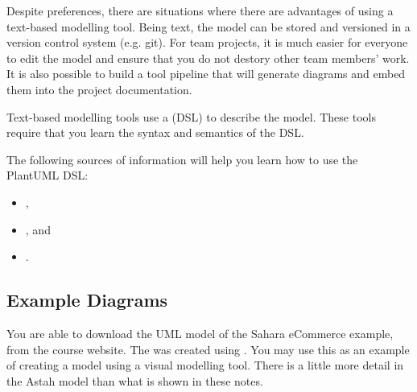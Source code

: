 Despite preferences, there are situations where there are advantages of using a text-based modelling tool.
Being text, the model can be stored and versioned in a version control system (e.g. git).
For team projects, it is much easier for everyone to edit the model and ensure that you do not destory other team members' work.
It is also possible to build a tool pipeline that will generate diagrams and embed them into the project documentation.

Text-based modelling tools use a
 (DSL) to describe the model.
These tools require that you learn the syntax and semantics of the DSL.

The following sources of information will help you learn how to use the PlantUML DSL:
\begin{itemize}[nosep]
    \item {},
    \item {}, and
    \item {}.
\end{itemize}

\subsection{Example Diagrams}
You are able to download the UML model of the Sahara eCommerce example, from the course website.
The 
was created using .
You may use this as an example of creating a model using a visual modelling tool.
There is a little more detail in the Astah model than what is shown in these notes.
